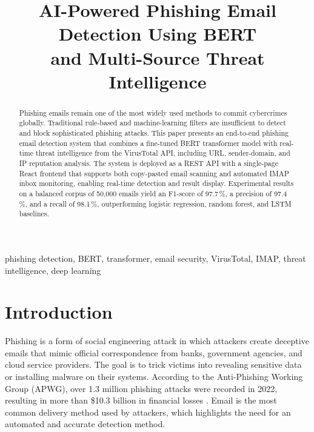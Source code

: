 \documentclass[conference]{IEEEtran}
\begin{document}
\title{AI-Powered Phishing Email Detection Using BERT\\
and Multi-Source Threat Intelligence}

\author{
}

\maketitle

\begin{abstract}
Phishing emails remain one of the most widely used methods to commit
cybercrimes globally. Traditional rule-based and machine-learning
filters are insufficient to detect and block sophisticated phishing
attacks. This paper presents an end-to-end phishing email detection
system that combines a fine-tuned BERT transformer model with
real-time threat intelligence from the VirusTotal API, including
URL, sender-domain, and IP reputation analysis. The system is
deployed as a REST API with a single-page React frontend that
supports both copy-pasted email scanning and automated IMAP inbox
monitoring, enabling real-time detection and result display.
Experimental results on a balanced corpus of 50{,}000 emails yield
an F1-score of 97.7\,\%, a precision of 97.4\,\%, and a recall of
98.1\,\%, outperforming logistic regression, random forest, and
LSTM baselines.
\end{abstract}

\begin{IEEEkeywords}
phishing detection, BERT, transformer, email security, VirusTotal,
IMAP, threat intelligence, deep learning
\end{IEEEkeywords}

\section{Introduction}

Phishing is a form of social engineering attack in which attackers
create deceptive emails that mimic official correspondence from
banks, government agencies, and cloud service providers. The goal
is to trick victims into revealing sensitive data or installing
malware on their systems. According to the Anti-Phishing Working
Group (APWG), over 1.3 million phishing attacks were recorded in
2022, resulting in more than \$10.3 billion in financial losses
\cite{apwg2024}. Email is the most common delivery method used by
attackers, which highlights the need for an automated and accurate
detection method.
\end{document}
